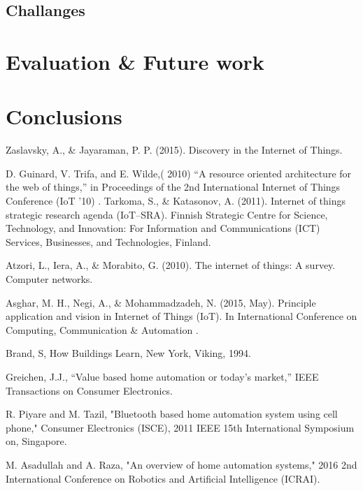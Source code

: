 \documentclass[conference]{IEEEtran}
\begin{document}
\subsection{Challanges}



\section{Evaluation \& Future work   }


\section{Conclusions  }



\begin{thebibliography}{00}
	
Zaslavsky, A., \& Jayaraman, P. P. (2015). Discovery in the Internet of Things. 
 
 D. Guinard, V. Trifa, and E. Wilde,( 2010) “A resource oriented architecture for the web of things,” in Proceedings of the 2nd International Internet of Things Conference (IoT ’10)
.
 Tarkoma, S., \& Katasonov, A. (2011). Internet of things strategic research agenda (IoT–SRA). Finnish Strategic Centre for Science, Technology, and Innovation: For Information and Communications (ICT) Services, Businesses, and Technologies, Finland.
 
 Atzori, L., Iera, A., \& Morabito, G. (2010). The internet of things: A survey. Computer networks.
 
 Asghar, M. H., Negi, A., \& Mohammadzadeh, N. (2015, May). Principle application and vision in Internet of Things (IoT). In International Conference on Computing, Communication \& Automation .
 
 Brand, S, How Buildings Learn, New York, Viking, 1994. 
 
 Greichen, J.J., “Value based home automation or today's market,” IEEE Transactions on Consumer Electronics.
 
 R. Piyare and M. Tazil, "Bluetooth based home automation system using cell phone," Consumer Electronics (ISCE), 2011 IEEE 15th
International Symposium on, Singapore.

 M. Asadullah and A. Raza, "An overview of home automation systems," 2016 2nd International Conference on Robotics and Artificial Intelligence (ICRAI).


\end{thebibliography}
\end{document}
